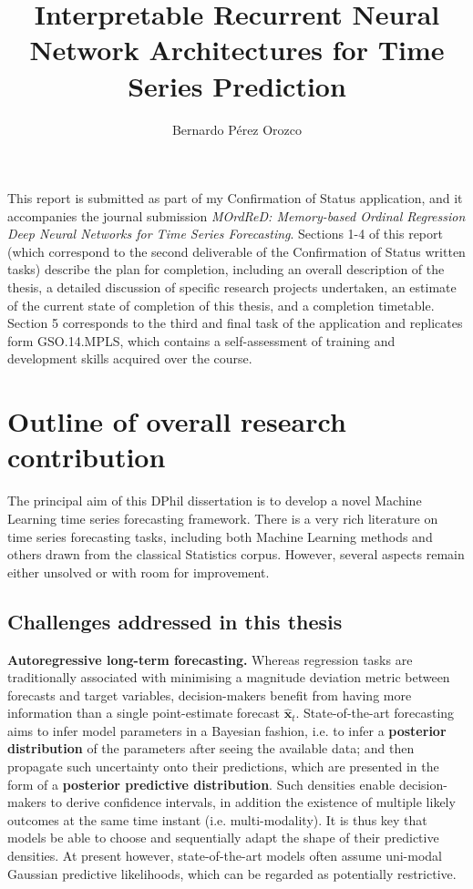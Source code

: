 \documentclass[pdftex,12pt,a4paper]{article}
\title{Interpretable Recurrent Neural Network Architectures for Time Series Prediction}
\author{Bernardo P\'erez Orozco}
\date{}
\theoremstyle{definition}
\theoremstyle{remark}
\begin{document}
\maketitle

This report is submitted as part of my Confirmation of Status application, and it accompanies the journal submission \textit{MOrdReD: Memory-based Ordinal Regression Deep Neural Networks for Time Series Forecasting}. Sections 1-4 of this report (which correspond to the second deliverable of the Confirmation of Status written tasks) describe the plan for completion, including an overall description of the thesis, a detailed discussion of specific research projects undertaken, an estimate of the current state of completion of this thesis, and a completion timetable. Section 5 corresponds to the third and final task of the application and replicates form GSO.14.MPLS, which contains a self-assessment of training and development skills acquired over the course.

\section{Outline of overall research contribution}
The principal aim of this DPhil dissertation is to develop a novel Machine Learning time series forecasting framework. There is a very rich literature on time series forecasting tasks, including both Machine Learning methods and others drawn from the classical Statistics corpus. However, several aspects remain either unsolved or with room for improvement.

\subsection{Challenges addressed in this thesis}

\textbf{Autoregressive long-term forecasting.} Whereas regression tasks are traditionally associated with minimising a magnitude deviation metric between forecasts and target variables, decision-makers benefit from having more information than a single point-estimate forecast $\mathbf{\hat{x}}_t$. State-of-the-art forecasting aims to infer model parameters in a Bayesian fashion, i.e. to infer a \textbf{posterior distribution} of the parameters after seeing the available data; and then propagate such uncertainty onto their predictions, which are presented in the form of a \textbf{posterior predictive distribution}. Such densities enable decision-makers to derive confidence intervals, in addition the existence of multiple likely outcomes at the same time instant (i.e. multi-modality). It is thus key that models be able to choose and sequentially adapt the shape of their predictive densities. At present however, state-of-the-art models often assume uni-modal Gaussian predictive likelihoods, which can be regarded as potentially restrictive.
\end{document}
